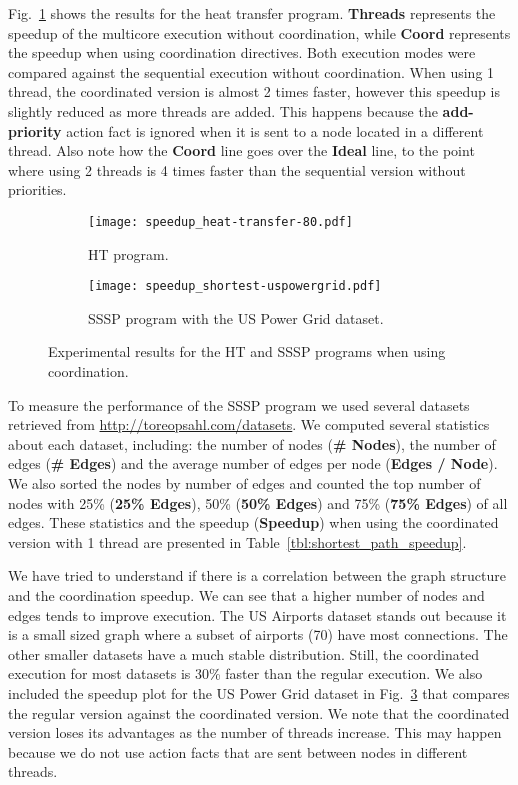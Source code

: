 Fig.~\ref{exp:heat-transfer} shows the results for the heat transfer program. \textbf{Threads} represents the speedup of the multicore execution
without coordination, while \textbf{Coord} represents the speedup when using coordination directives.
Both execution modes were compared against the sequential execution without coordination.
When using 1 thread, the coordinated version is almost 2 times
faster, however this speedup is slightly reduced as more threads are added. This happens because the \textbf{add-priority} action fact is ignored
when it is sent to a node located in a different thread.
Also note how the \textbf{Coord} line goes over the \textbf{Ideal} line, to the point where using 2 threads is 4 times faster than the sequential
version without priorities.

\begin{figure}[h!]
     \centering
   \begin{subfigure}[b]{0.4\textwidth}
      \texttt{[image: speedup\_heat-transfer-80.pdf]}
      \caption{HT program.\newline}\label{exp:heat-transfer}
   \end{subfigure}
   \begin{subfigure}[b]{0.4\textwidth}
      \texttt{[image: speedup\_shortest-uspowergrid.pdf]}
      \caption{SSSP program with the US Power Grid dataset.}\label{exp:sssp-uspowergrid}
   \end{subfigure}
   \caption{Experimental results for the HT and SSSP programs when using coordination.}
\end{figure}

To measure the performance of the SSSP program we used several datasets retrieved from \url{http://toreopsahl.com/datasets}. We computed several
statistics about each dataset, including: the number of nodes (\textbf{\# Nodes}), the number of edges (\textbf{\# Edges}) and
the average number of edges per node (\textbf{Edges / Node}). We also sorted the nodes by number of edges and counted the top number of nodes
with 25\% (\textbf{25\% Edges}), 50\% (\textbf{50\% Edges}) and 75\% (\textbf{75\% Edges}) of all edges.
These statistics and the speedup (\textbf{Speedup}) when using the coordinated version with 1 thread are presented in Table~\ref{tbl:shortest_path_speedup}.

We have tried to understand if there is a correlation between the graph structure and the coordination speedup. We can see that a higher number
of nodes and edges tends to improve execution. The US Airports dataset stands out because it is a small sized graph where a subset of airports
(70) have most connections. The other smaller datasets have a much stable distribution.
Still, the coordinated execution for most datasets is 30\% faster than the regular execution. We also included the speedup plot
for the US Power Grid dataset in Fig.~\ref{exp:sssp-uspowergrid} that compares the regular version against the coordinated version.
We note that the coordinated version loses its advantages as the number of threads increase. This may happen because we do not
use action facts that are sent between nodes in different threads.

